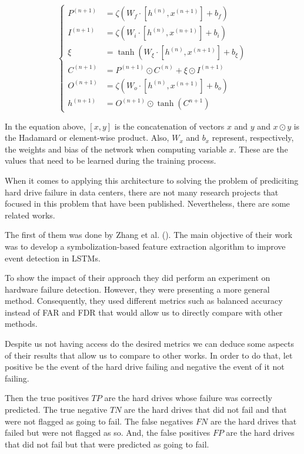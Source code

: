 \begin{equation}\label{eq:lstm_calculations}
    \begin{cases}
        P^{(n+1)} &= \zeta(W_f\cdot[h^{(n)}, x^{(n+1)}] + b_f) \\
        I^{(n+1)} &= \zeta(W_i\cdot[h^{(n)}, x^{(n+1)}] + b_i) \\
        \xi &= \tanh(W_\xi\cdot[h^{(n)}, x^{(n+1)}] + b_\xi) \\
        C^{(n+1)} &= P^{(n+1)} \odot C^{(n)} + \xi \odot I^{(n+1)} \\
        O^{(n+1)} &= \zeta(W_o\cdot[h^{(n)}, x^{(n+1)}] + b_o) \\
        h^{(n+1)} &= O^{(n+1)} \odot \tanh(C^{n+1})
    \end{cases}
\end{equation}

In the equation above, $[x, y]$ is the concatenation of vectors $x$ and $y$ and $x \odot y$ is the Hadamard or element-wise product.
Also, $W_x$ and $b_x$ represent, respectively, the weights and bias of the network when computing variable $x$.
These are the values that need to be learned during the training process.

When it comes to applying this architecture to solving the problem of prediciting hard drive failure in data centers, there are not many research projects that focused in this problem that have been published.
Nevertheless, there are some related works.

The first of them was done by Zhang et al. (\cite{zhang2017deep}).
The main objective of their work was to develop a symbolization-based feature extraction algorithm to improve event detection in LSTMs.

To show the impact of their approach they did perform an experiment on hardware failure detection.
However, they were presenting a more general method.
Consequently, they used different metrics such as balanced accuracy instead of FAR and FDR that would allow us to directly compare with other methods.

Despite us not having access do the desired metrics we can deduce some aspects of their results that allow us to compare to other works.
In order to do that, let positive be the event of the hard drive failing and negative the event of it not failing.

Then the true positives $TP$ are the hard drives whose failure was correctly predicted.
The true negative $TN$ are the hard drives that did not fail and that were not flagged as going to fail.
The false negatives $FN$ are the hard drives that failed but were not flagged as so.
And, the false positives $FP$ are the hard drives that did not fail but that were predicted as going to fail.

